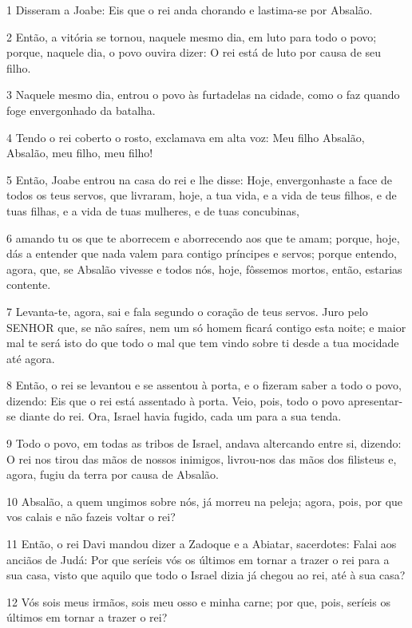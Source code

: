 \par 1 Disseram a Joabe: Eis que o rei anda chorando e lastima-se por Absalão.
\par 2 Então, a vitória se tornou, naquele mesmo dia, em luto para todo o povo; porque, naquele dia, o povo ouvira dizer: O rei está de luto por causa de seu filho.
\par 3 Naquele mesmo dia, entrou o povo às furtadelas na cidade, como o faz quando foge envergonhado da batalha.
\par 4 Tendo o rei coberto o rosto, exclamava em alta voz: Meu filho Absalão, Absalão, meu filho, meu filho!
\par 5 Então, Joabe entrou na casa do rei e lhe disse: Hoje, envergonhaste a face de todos os teus servos, que livraram, hoje, a tua vida, e a vida de teus filhos, e de tuas filhas, e a vida de tuas mulheres, e de tuas concubinas,
\par 6 amando tu os que te aborrecem e aborrecendo aos que te amam; porque, hoje, dás a entender que nada valem para contigo príncipes e servos; porque entendo, agora, que, se Absalão vivesse e todos nós, hoje, fôssemos mortos, então, estarias contente.
\par 7 Levanta-te, agora, sai e fala segundo o coração de teus servos. Juro pelo SENHOR que, se não saíres, nem um só homem ficará contigo esta noite; e maior mal te será isto do que todo o mal que tem vindo sobre ti desde a tua mocidade até agora.
\par 8 Então, o rei se levantou e se assentou à porta, e o fizeram saber a todo o povo, dizendo: Eis que o rei está assentado à porta. Veio, pois, todo o povo apresentar-se diante do rei. Ora, Israel havia fugido, cada um para a sua tenda.
\par 9 Todo o povo, em todas as tribos de Israel, andava altercando entre si, dizendo: O rei nos tirou das mãos de nossos inimigos, livrou-nos das mãos dos filisteus e, agora, fugiu da terra por causa de Absalão.
\par 10 Absalão, a quem ungimos sobre nós, já morreu na peleja; agora, pois, por que vos calais e não fazeis voltar o rei?
\par 11 Então, o rei Davi mandou dizer a Zadoque e a Abiatar, sacerdotes: Falai aos anciãos de Judá: Por que seríeis vós os últimos em tornar a trazer o rei para a sua casa, visto que aquilo que todo o Israel dizia já chegou ao rei, até à sua casa?
\par 12 Vós sois meus irmãos, sois meu osso e minha carne; por que, pois, seríeis os últimos em tornar a trazer o rei?
